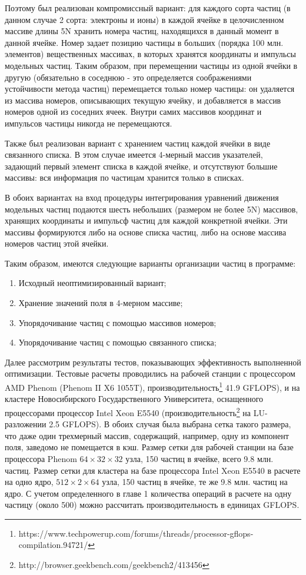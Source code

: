 Поэтому был реализован компромиссный вариант: для каждого сорта частиц (в данном случае 2 сорта: электроны и ионы) в каждой ячейке в целочисленном массиве длины 5N хранить номера частиц, находящихся в данный момент в данной ячейке. Номер задает позицию частицы в больших (порядка 100 млн. элементов) вещественных массивах, в которых хранятся координаты и импульсы модельных частиц. Таким образом, при перемещении частицы из одной ячейки в другую (обязательно в соседнюю - это определяется соображениями устойчивости метода частиц) перемещается только номер частицы: он удаляется из массива номеров, описывающих текущую ячейку, и добавляется в массив номеров одной из соседних ячеек. Внутри самих массивов координат и импульсов частицы никогда не перемещаются. 

Также был реализован вариант с хранением частиц каждой ячейки в виде связанного списка. В этом случае имеется 4-мерный массив указателей, задающий первый элемент списка в каждой ячейке, и отсутствуют большие массивы: вся информация по частицам хранится только в списках. 

В обоих вариантах на вход процедуры интегрирования уравнений движения модельных частиц подаются шесть небольших (размером не более 5N) массивов, хранящих координаты и импульсф частиц для каждой конкретной ячейки. Эти массивы формируются либо на основе списка частиц, либо на основе массива номеров частиц этой ячейки. 

Таким образом, имеются следующие варианты организации частиц в программе:
\begin{enumerate}
	\item Исходный неоптимизированный вариант; 
	\item Хранение значений поля в 4-мерном массиве; 
	\item Упорядочивание частиц с помощью массивов номеров; 
	\item Упорядочивание частиц с помощью связанного списка; 
\end{enumerate}

Далее рассмотрим результаты тестов, показывающих эффективность выполненной оптимизации. Тестовые расчеты проводились на рабочей станции с процессором AMD Phenom (Phenom II X6 1055T),  производительность\footnote{https://www.techpowerup.com/forums/threads/processor-gflops-compilation.94721/} 41.9 GFLOPS), и на кластере Новосибирского Государственного Университета, оснащенного процессорами процессор Intel Xeon  E5540 (производительность\footnote{http://browser.geekbench.com/geekbench2/413456} на LU-разложении 2.5 GFLOPS). В обоих случая была выбрана сетка такого размера, что даже один трехмерный массив, содержащий, например, одну из компонент поля, заведомо не помещается в кэш. 
Размер сетки для рабочей станции на базе процессора Phenom  $64\times32\times32$ узла, 150 частиц в ячейке, всего 9.8 млн. частиц. Размер сетки для кластера на базе процессора Intel Xeon  E5540 в расчете на одно ядро, $512\times2\times64$ узла, 150 частиц в ячейке, те же 9.8 млн. частиц на ядро. С учетом определенного в главе 1 количества операций в расчете на одну частицу (около 500) можно рассчитать производительность в единицах GFLOPS.

